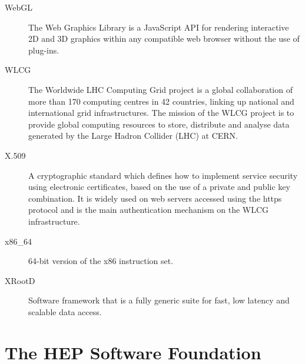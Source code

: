 \documentclass[12pt,a4paper]{article}
\begin{document}
\begin{appendices}
\begin{description}
\item[WebGL] The Web Graphics Library is a JavaScript API for rendering
interactive 2D and 3D graphics within any compatible web browser without
the use of plug-ins.

\item[WLCG] The Worldwide LHC Computing Grid project is a global collaboration
of more than 170 computing centres in 42 countries, linking up national
and international grid infrastructures. The mission of the WLCG project
is to provide global computing resources to store, distribute and
analyse data generated by the Large Hadron Collider (LHC) at CERN.

\item[X.509] A cryptographic standard which defines how to implement service
security using electronic certificates, based on the use of a private
and public key combination. It is widely used on web servers accessed
using the https protocol and is the main authentication mechanism on the
WLCG infrastructure.

\item[x86\_64] 64-bit version of the x86 instruction set.

\item[XRootD] Software framework that is a fully generic suite for fast, low latency and scalable data access.

\end{description}

\end{appendices}

\sloppy
\raggedright
\clearpage
\printbibliography[title={References},heading=bibintoc]

\clearpage
\section*{The HEP Software Foundation}

\end{document}
